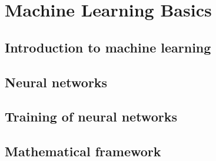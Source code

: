







\section{Machine Learning Basics}
\subsection{Introduction to machine learning}

\subsection{Neural networks}

\subsection{Training of neural networks}

\subsection{Mathematical framework}




\printbibliography
